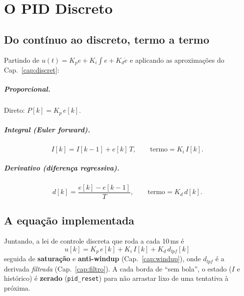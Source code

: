 \chapter{O PID Discreto}\label{cap:pidd}

\section{Do cont\'inuo ao discreto, termo a termo}
Partindo de $u(t)=K_p e+K_i\!\int e+K_d\dot e$ e aplicando as aproxima\c{c}\~oes do
Cap.~\ref{cap:discret}:

\paragraph{Proporcional.} Direto: $P[k]=K_p\,e[k]$.

\paragraph{Integral (Euler forward).}
\begin{equation}
I[k]=I[k-1]+e[k]\,T, \qquad \text{termo} = K_i\,I[k].
\end{equation}

\paragraph{Derivativo (diferen\c{c}a regressiva).}
\begin{equation}
d[k]=\frac{e[k]-e[k-1]}{T}, \qquad \text{termo} = K_d\,d[k].
\end{equation}

\section{A equa\c{c}\~ao implementada}
Juntando, a lei de controle discreta que roda a cada 10\,ms \'e
\begin{equation}
\boxed{\ u[k]=K_p\,e[k]+K_i\,I[k]+K_d\,d_{lpf}[k]\ }
\label{eq:uk}
\end{equation}
seguida de \textbf{satura\c{c}\~ao} e \textbf{anti-windup} (Cap.~\ref{cap:windup}), onde
$d_{lpf}$ \'e a derivada \emph{filtrada} (Cap.~\ref{cap:filtro}). A cada borda de ``sem bola'', o
estado ($I$ e hist\'orico) \'e \textbf{zerado} (\texttt{pid\_reset}) para n\~ao
arrastar lixo de uma tentativa \`a pr\'oxima.


